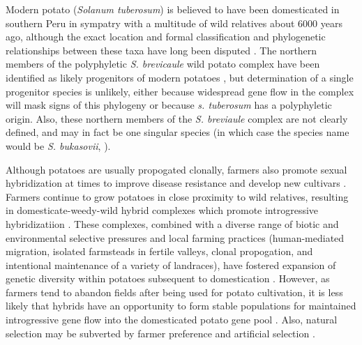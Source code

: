 \documentclass[11pt]{article}
\begin{document}
\begin{enumerate}
Modern potato (\emph{Solanum tuberosum}) is believed to have been domesticated in southern Peru in sympatry with a multitude of wild relatives about 6000 years ago, although the exact location and formal classification and phylogenetic relationships between these taxa have long been disputed \cite{huaman2002reclassification, spooner2005single, pickersgill1977origins, hawkes1988evolution}.
The northern members of the polyphyletic \emph{S. brevicaule} wild potato complex have been identified as likely progenitors of modern potatoes \cite{correll1962potato}, but determination of a single progenitor species is unlikely, either because widespread gene flow in the complex will mask signs of this phylogeny or because \emph{s. tuberosum} has a polyphyletic origin.
Also, these northern members of the \emph{S. breviaule} complex are not clearly defined, and may in fact be one singular species (in which case the species name would be \emph{S. bukasovii}, \cite{spooner2005single}).

Although potatoes are usually propogated clonally, farmers also promote sexual hybridization at times to improve disease resistance and develop new cultivars \cite{quiros1992increase}.
Farmers continue to grow potatoes in close proximity to wild relatives, resulting in domesticate-weedy-wild hybrid complexes which promote introgressive hybridizatiion \cite{rabinowitz1990high, johns1987relationships, linder1987diversity}.
These complexes, combined with a diverse range of biotic and environmental selective pressures and local farming practices (human-mediated migration, isolated farmsteads in fertile valleys, clonal propogation, and intentional maintenance of a variety of landraces), have fostered expansion of genetic diversity within potatoes subsequent to domestication \cite{brush1995potato}.
However, as farmers tend to abandon fields after being used for potato cultivation, it is less likely that hybrids have an opportunity to form stable populations for maintained introgressive gene flow into the domesticated potato gene pool \cite{brush1995potato}.
Also, natural selection may be subverted by farmer preference and artificial selection \cite{brush1981dynamics}.


\end{enumerate}
\end{document}
